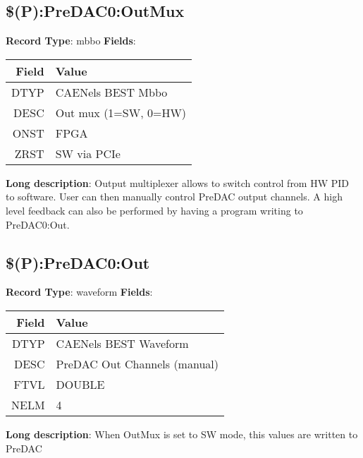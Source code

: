 \subsection{\$(P):PreDAC0:OutMux}
\textbf{Record Type}: mbbo \newline \newline 
\textbf{Fields}: \newline 
\begin{tabularx}{0.7\linewidth}{|r|X|}
\hline Field & Value \\
\hline
\hline
DTYP & CAENels BEST Mbbo\\
\hline
DESC & Out mux (1=SW, 0=HW)\\
\hline
ONST & FPGA\\
\hline
ZRST & SW via PCIe\\
\hline
\end{tabularx}
\newline \newline \newline
\textbf{Long description}: \newline 
 Output multiplexer allows to switch control from HW PID to software. User can then manually control PreDAC output channels. A high level feedback can also be performed by having a program writing to PreDAC0:Out.
\newline \newline


\subsection{\$(P):PreDAC0:Out}
\textbf{Record Type}: waveform \newline \newline 
\textbf{Fields}: \newline 
\begin{tabularx}{0.7\linewidth}{|r|X|}
\hline Field & Value \\
\hline
\hline
DTYP & CAENels BEST Waveform\\
\hline
DESC & PreDAC Out Channels (manual)\\
\hline
FTVL & DOUBLE\\
\hline
NELM & 4\\
\hline
\end{tabularx}
\newline \newline \newline
\textbf{Long description}: \newline 
 When OutMux is set to SW mode, this values are written to PreDAC
\newline \newline


